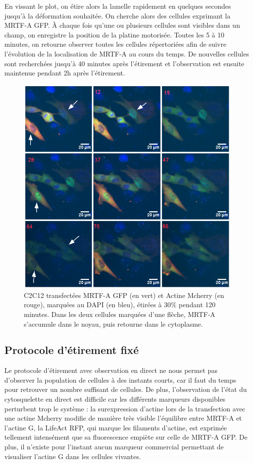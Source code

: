 \documentclass{report}
\begin{document}
	En vissant le plot, on étire alors la lamelle rapidement en quelques secondes jusqu'à la déformation souhaitée. On cherche alors des cellules exprimant la MRTF-A GFP. À chaque fois qu'une ou plusieurs cellules sont visibles dans un champ, on enregistre la position de la platine motorisée. Toutes les 5 à 10 minutes, on retourne observer toutes les cellules répertoriées afin de suivre l'évolution de la localisation de MRTF-A au cours du temps. De nouvelles cellules sont recherchées jusqu'à 40 minutes après l'étirement et l'observation est ensuite maintenue pendant 2h après l'étirement. 
	\begin{figure}
	\includegraphics[scale=0.5]{Montage_translocations_2013-04-16_l2z1.png}
	\caption{C2C12 transfectées MRTF-A GFP (en vert) et Actine Mcherry (en rouge), marquées au DAPI (en bleu), étirées à 30\% pendant 120 minutes. Dans les deux cellules marquées d'une flèche, MRTF-A s'accumule dans le noyau, puis retourne dans le cytoplasme.}
	\label{Etirement_live}
	\end{figure}
	
	
	\subsection{Protocole d'étirement fixé}
	
	Le protocole d'étirement avec observation en direct ne nous permet pas d'observer la population de cellules à des instants courts, car il faut du temps pour retrouver un nombre suffisant de cellules. De plus, l'observation de l'état du cytosquelette en direct est difficile car les différents marqueurs disponibles perturbent trop le système : la surexpression d'actine lors de la transfection avec une actine Mcherry modifie de manière très visible l'équilibre entre MRTF-A et l'actine G, la LifeAct RFP, qui marque les filaments d'actine, est exprimée tellement intensément que sa fluorescence empiète sur celle de MRTF-A GFP. De plus, il n'existe pour l'instant aucun marqueur commercial permettant de visualiser l'actine G dans les cellules vivantes. 
	
\end{document}
